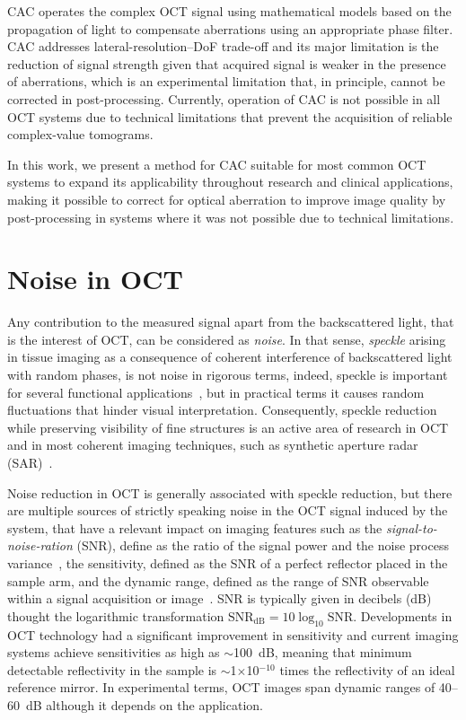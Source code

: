 CAC operates the complex OCT signal using mathematical models based on the propagation of light to compensate aberrations using an appropriate phase filter. CAC addresses lateral-resolution--DoF trade-off and its major limitation is the reduction of signal strength given that acquired signal is weaker in the presence of aberrations, which is an experimental limitation that, in principle, cannot be corrected in post-processing. Currently, operation of CAC is not possible in all OCT systems due to technical limitations that prevent the acquisition of reliable complex-value tomograms.

In this work, we present a method for CAC suitable for most common OCT systems to expand its applicability throughout research and clinical applications, making it possible to correct for optical aberration to improve image quality by post-processing in systems where it was not possible due to technical limitations.

\section{Noise in OCT}

Any contribution to the measured signal apart from the backscattered light, that is the interest of OCT, can be considered as \textit{noise}. In that sense, \textit{speckle} arising in tissue imaging as a consequence of coherent interference of backscattered light with random phases, is not noise in rigorous terms, indeed, speckle is important for several functional applications~\cite{}, but in practical terms it causes random fluctuations that hinder visual interpretation. Consequently, speckle reduction while preserving visibility of fine structures is an active area of research in OCT~\cite{} and in most coherent imaging techniques, such as synthetic aperture radar (SAR)~\cite{}.

Noise reduction in OCT is generally associated with speckle reduction, but there are multiple sources of strictly speaking noise in the OCT signal induced by the system, that have a relevant impact on imaging features such as the \textit{signal-to-noise-ration} (SNR), define as the ratio of the signal power and the noise process variance~\cite{}, the sensitivity, defined as the SNR of a perfect reflector placed in the sample arm, and the dynamic range, defined as the range of SNR observable within a signal acquisition or image~\cite{}. SNR is typically given in decibels (dB) thought the logarithmic transformation $\text{SNR}_{\text{dB}} = 10\log_{10}\text{SNR}$. Developments in OCT technology had a significant improvement in sensitivity and current imaging systems achieve sensitivities as high as $\sim$100~dB, meaning that minimum detectable reflectivity in the sample is $\sim$1$\times$10$^{-10}$ times the reflectivity of an ideal reference mirror. In experimental terms, OCT images span dynamic ranges of 40--60~dB although it depends on the application.

